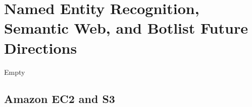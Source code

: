 \section{Named Entity Recognition, Semantic Web, and Botlist Future Directions}

Empty

\subsection{Amazon EC2 and S3}

